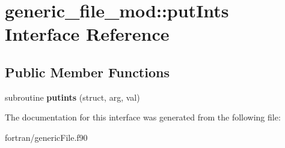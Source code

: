 \hypertarget{interfacegeneric__file__mod_1_1put_ints}{}\section{generic\+\_\+file\+\_\+mod\+:\+:put\+Ints Interface Reference}
\label{interfacegeneric__file__mod_1_1put_ints}
\subsection*{Public Member Functions}
\begin{DoxyCompactItemize}
\item 
\mbox{\label{interfacegeneric__file__mod_1_1put_ints_ace612bb74b22f875df43a062ee4a595a}} 
subroutine {\bfseries putints} (struct, arg, val)
\end{DoxyCompactItemize}


The documentation for this interface was generated from the following file\+:\begin{DoxyCompactItemize}
\item 
fortran/generic\+File.\+f90\end{DoxyCompactItemize}
